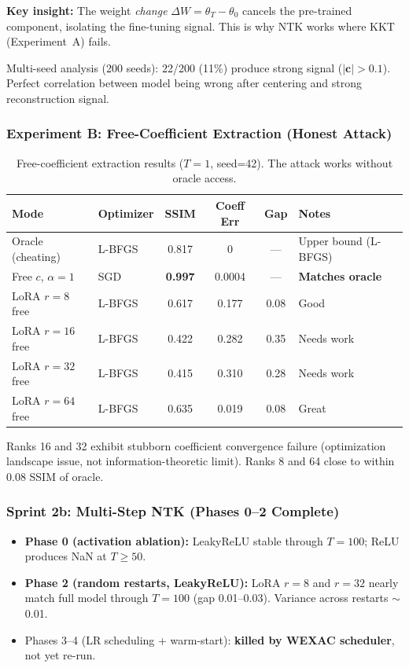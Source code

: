 \documentclass[11pt,a4paper]{article}
\newcommand{\proven}[1]{\textcolor{proven}{\textbf{#1}}}
\newcommand{\speculated}[1]{\textcolor{speculated}{\textbf{#1}}}
\begin{document}
\textbf{Key insight:} The weight \emph{change} $\Delta W = \theta_T - \theta_0$ cancels the pre-trained component, isolating the fine-tuning signal. This is why NTK works where KKT (Experiment~A) fails.

Multi-seed analysis (200 seeds): 22/200 (11\%) produce strong signal ($|\mathbf{c}| > 0.1$). Perfect correlation between model being wrong after centering and strong reconstruction signal.

\subsubsection{Experiment B: Free-Coefficient Extraction (Honest Attack)}

\begin{table}[H]
\centering
\caption{Free-coefficient extraction results ($T=1$, seed=42). The attack works without oracle access.}
\label{tab:free-c}
\begin{tabular}{llcccl}
\toprule
\textbf{Mode} & \textbf{Optimizer} & \textbf{SSIM} & \textbf{Coeff Err} & \textbf{Gap} & \textbf{Notes} \\
\midrule
Oracle (cheating)    & L-BFGS & 0.817 & 0     & ---  & Upper bound (L-BFGS) \\
Free $c$, $\alpha\!=\!1$ & SGD    & \proven{0.997} & 0.0004 & --- & \textbf{Matches oracle} \\
\midrule
LoRA $r\!=\!8$ free  & L-BFGS & 0.617 & 0.177 & 0.08 & Good \\
LoRA $r\!=\!16$ free & L-BFGS & 0.422 & 0.282 & 0.35 & Needs work \\
LoRA $r\!=\!32$ free & L-BFGS & 0.415 & 0.310 & 0.28 & Needs work \\
LoRA $r\!=\!64$ free & L-BFGS & 0.635 & 0.019 & 0.08 & Great \\
\bottomrule
\end{tabular}
\end{table}

Ranks 16 and 32 exhibit stubborn coefficient convergence failure (optimization landscape issue, not information-theoretic limit). Ranks 8 and 64 close to within 0.08 SSIM of oracle.

\subsubsection{Sprint 2b: Multi-Step NTK (Phases 0--2 Complete)}

\begin{itemize}[nosep]
    \item \textbf{Phase 0 (activation ablation):} LeakyReLU stable through $T\!=\!100$; ReLU produces NaN at $T \geq 50$.
    \item \textbf{Phase 2 (random restarts, LeakyReLU):} LoRA $r\!=\!8$ and $r\!=\!32$ nearly match full model through $T\!=\!100$ (gap 0.01--0.03). Variance across restarts $\sim$0.01.
    \item Phases 3--4 (LR scheduling + warm-start): \speculated{killed by WEXAC scheduler}, not yet re-run.
\end{itemize}
\end{document}
